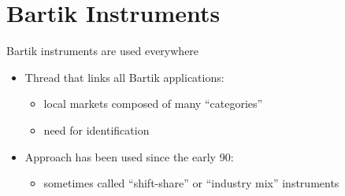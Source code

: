 \documentclass[notes,11pt, aspectratio=169]{beamer}
\begin{document}
\section{Bartik Instruments}

\begin{frame}{Bartik instruments are used everywhere}
  \begin{center}
  \end{center}
  \begin{itemize}
  \item Thread that links all Bartik applications:
    \begin{itemize}
    \item local markets composed of many ``categories''
    \item need for identification
    \end{itemize}
    \smallskip
  \item Approach has been used since the early 90:
    \begin{itemize}
    \item sometimes called ``shift-share'' or ``industry mix'' instruments
    \end{itemize}
  \end{itemize}
\end{frame}
\end{document}
